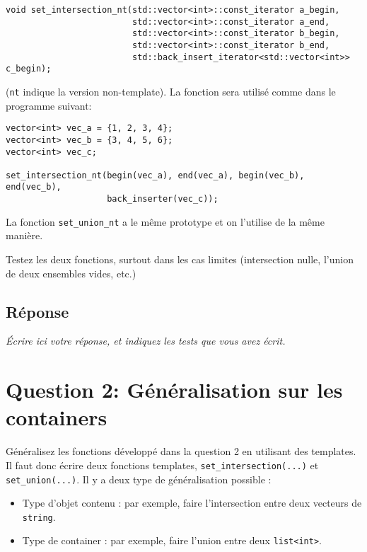 \documentclass{article}
\begin{document}
\begin{verbatim}
void set_intersection_nt(std::vector<int>::const_iterator a_begin, 
                         std::vector<int>::const_iterator a_end, 
                         std::vector<int>::const_iterator b_begin, 
                         std::vector<int>::const_iterator b_end,
                         std::back_insert_iterator<std::vector<int>> c_begin);
\end{verbatim}
(\texttt{nt} indique la version non-template). 
La fonction sera utilisé comme dans le programme suivant: 

\begin{verbatim}
vector<int> vec_a = {1, 2, 3, 4};
vector<int> vec_b = {3, 4, 5, 6};
vector<int> vec_c;

set_intersection_nt(begin(vec_a), end(vec_a), begin(vec_b), end(vec_b), 
                    back_inserter(vec_c));
\end{verbatim}

La fonction \texttt{set\_union\_nt} a le même prototype et on l'utilise de la
même manière.

Testez les deux fonctions, surtout dans les cas limites (intersection
nulle, l'union de deux ensembles vides, etc.) 

\subsection*{Réponse}
\label{sec:org8329b7f}

\emph{Écrire ici votre réponse, et indiquez les tests que vous avez écrit.}


\section*{Question 2: Généralisation sur les containers}
\label{sec:org9ab3bdf}

Généralisez les fonctions développé dans la question 2 en utilisant
des templates. Il faut donc écrire deux fonctions templates,
\texttt{set\_intersection(...)} et \texttt{set\_union(...)}.  Il y a deux type de
généralisation possible :

\begin{itemize}
\item Type d'objet contenu : par exemple, faire l'intersection entre
deux vecteurs de \texttt{string}.
\item Type de container : par exemple, faire l'union entre deux \texttt{list<int>}.
\end{itemize}
\end{document}
